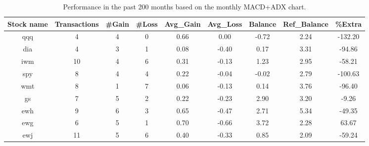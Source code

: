 \begin{table}[H]
\caption{Performance in the past 200 months based on the monthly MACD+ADX chart.}
\label{tab:months}
\begin{center}
\begin{tabular}{ccccccccc}
Stock name & Transactions & \#Gain & \#Loss & Avg\_Gain & Avg\_Loss & Balance & Ref\_Balance & \%Extra\\   
\hline
qqq&4&4&0&0.66&0.00&-0.72&2.24&-132.20\\
dia&4&3&1&0.08&-0.40&0.17&3.31&-94.86\\
iwm&10&4&6&0.31&-0.13&1.23&2.95&-58.21\\
spy&8&4&4&0.22&-0.04&-0.02&2.79&-100.63\\
wmt&8&1&7&0.06&-0.13&0.14&3.76&-96.40\\
gs&7&5&2&0.22&-0.23&2.90&3.20&-9.26\\
ewh&9&6&3&0.65&-0.47&2.71&5.34&-49.35\\
ewg&6&5&1&0.70&-0.66&3.72&2.28&63.67\\
ewj&11&5&6&0.40&-0.33&0.85&2.09&-59.24\\
\hline
\end{tabular}
\end{center}
\end{table}
